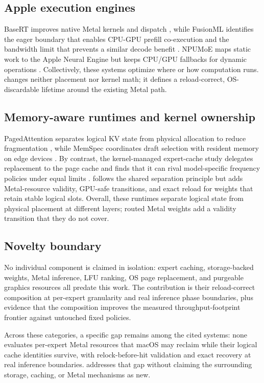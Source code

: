 \subsection{Apple execution engines}

BaseRT improves native Metal kernels and dispatch
\cite{rathnayaka2026basert}, while FusionML identifies the eager boundary that
enables CPU-GPU prefill co-execution and the bandwidth limit that prevents a
similar decode benefit \cite{mohite2026fusionml}. NPUMoE maps static work to the
Apple Neural Engine but keeps CPU/GPU fallbacks for dynamic operations
\cite{benazir2026npumoe}. Collectively, these systems optimize where or how
computation runs. \system changes neither placement nor kernel math; it defines
a reload-correct, OS-discardable lifetime around the existing Metal path.

\subsection{Memory-aware runtimes and kernel ownership}

PagedAttention separates logical KV state from physical allocation to reduce
fragmentation \cite{kwon2023pagedattention}, while MemSpec coordinates draft
selection with resident memory on edge devices \cite{kim2026memspec}. By
contrast, the kernel-managed expert-cache study delegates replacement to the
page cache and finds that it can rival model-specific frequency policies under
equal limits \cite{si2026kernelcache}. \system follows the shared separation
principle but adds Metal-resource validity, GPU-safe transitions, and exact
reload for weights that retain stable logical slots.
Overall, these runtimes separate logical state from physical placement at
different layers; routed Metal weights add a validity transition that they do
not cover.

\subsection{Novelty boundary}

No individual component is claimed in isolation: expert caching, storage-backed
weights, Metal inference, LFU ranking, OS page replacement, and purgeable
graphics resources all predate this work. The contribution is their
reload-correct composition at per-expert granularity and real inference phase
boundaries, plus evidence that the composition improves the measured
throughput-footprint frontier against untouched fixed policies.

Across these categories, a specific gap remains among the cited systems: none
evaluates per-expert Metal resources that macOS may reclaim while their logical
cache identities survive, with relock-before-hit validation and exact recovery
at real inference boundaries. \system addresses that gap without claiming the
surrounding storage, caching, or Metal mechanisms as new.
